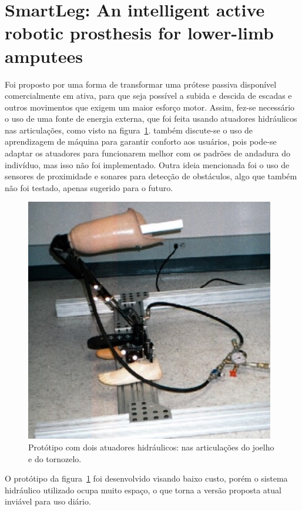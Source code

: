 \section{SmartLeg: An intelligent active robotic prosthesis for lower-limb amputees}
\label{sec:rel_smartleg}
Foi proposto por  uma forma de transformar uma prótese passiva disponível comercialmente em ativa, para que seja possível a subida e descida de escadas e outros movimentos que exigem um maior esforço motor. Assim, fez-se necessário o uso de uma fonte de energia externa, que foi feita usando atuadores hidráulicos nas articulações, como visto na figura~\ref{fig:rel_smartleg_1}.  também discute-se o uso de aprendizagem de máquina para garantir conforto aos usuários, pois pode-se adaptar os atuadores para funcionarem melhor com os padrões de andadura do indivíduo, mas isso não foi implementado. Outra ideia mencionada foi o uso de sensores de proximidade e sonares para detecção de obstáculos, algo que também não foi testado, apenas sugerido para o futuro.

\begin{figure}[h]
	\caption{\label{fig:rel_smartleg_1}Protótipo com dois atuadores hidráulicos: nas articulações do joelho e do tornozelo.}
	\begin{center}
	    \includegraphics[width=.5\textwidth]{resources/rel_dedic_smart_leg_1}
	\end{center}
\end{figure}

O protótipo da figura~\ref{fig:rel_smartleg_1} foi desenvolvido visando baixo custo, porém o sistema hidráulico utilizado ocupa muito espaço, o que torna a versão proposta atual inviável para uso diário.


